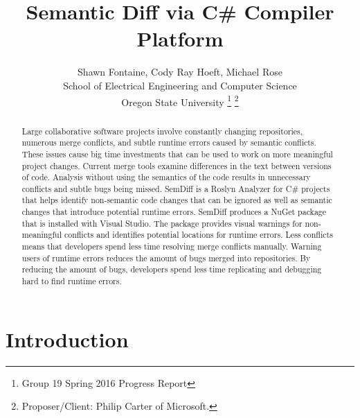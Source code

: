 \documentclass[draftclsnofoot,onecolumn]{IEEEtran}
\begin{document}
\lstset{style=cSharp}
\title{Semantic Diff via C\# Compiler Platform}

\author{Shawn Fontaine, Cody Ray Hoeft, Michael Rose\\
	School of Electrical Engineering and Computer Science\\
	Oregon State University
\thanks{Group 19 Spring 2016 Progress Report}
\thanks{Proposer/Client: Philip Carter of Microsoft.}}

\maketitle
{} %

\begin{abstract}
Large collaborative software projects involve constantly changing repositories, numerous merge conflicts, and subtle runtime errors caused by semantic conflicts. These issues cause big time investments that can be used to work on more meaningful project changes. Current merge tools examine differences in the text between versions of code. Analysis without using the semantics of the code results in unnecessary conflicts and subtle bugs being missed. SemDiff is a Roslyn Analyzer for C\# projects that helps identify non-semantic code changes that can be ignored as well as semantic changes that introduce potential runtime errors. SemDiff produces a NuGet package that is installed with Visual Studio. The package provides visual warnings for non-meaningful conflicts and identifies potential locations for runtime errors. Less conflicts means that developers spend less time resolving merge conflicts manually. Warning users of runtime errors reduces the amount of bugs merged into repositories. By reducing the amount of bugs, developers spend less time replicating and debugging hard to find runtime errors.
\end{abstract}

\newpage
\setcounter{tocdepth}{2}
\tableofcontents


\newpage
{}

\section{Introduction}%
\end{document}
